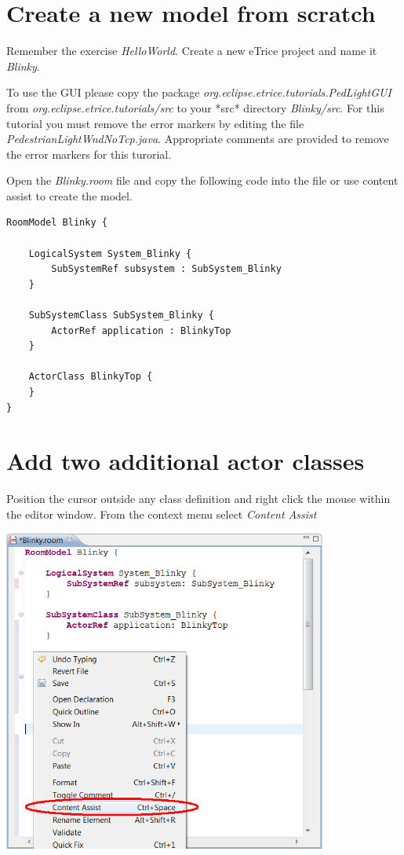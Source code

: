 \section{Create a new model from scratch}

Remember the exercise \textit{HelloWorld}.
Create a new eTrice project and name it \textit{Blinky}.

To use the GUI please copy the package \textit{org.eclipse.etrice.tutorials.PedLightGUI} from \textit{org.eclipse.etrice.tutorials/src} to your *src* directory \textit{Blinky/src}. For this tutorial you must remove the error markers by editing the file \textit{PedestrianLightWndNoTcp.java}. Appropriate comments are provided to remove the error markers for this turorial.

Open the \textit{Blinky.room} file and copy the following code into the file or use content assist to create the model.

\begin{verbatim} 
RoomModel Blinky {

    LogicalSystem System_Blinky {
        SubSystemRef subsystem : SubSystem_Blinky
    }

    SubSystemClass SubSystem_Blinky {
        ActorRef application : BlinkyTop
    }

    ActorClass BlinkyTop {
    }
}
\end{verbatim}

\section{Add two additional actor classes}

Position the cursor outside any class definition and right click the mouse within the editor window. From the context menu select \textit{Content Assist}  

\includegraphics[width=0.8\textwidth]{images/020-Blinky02.png}

